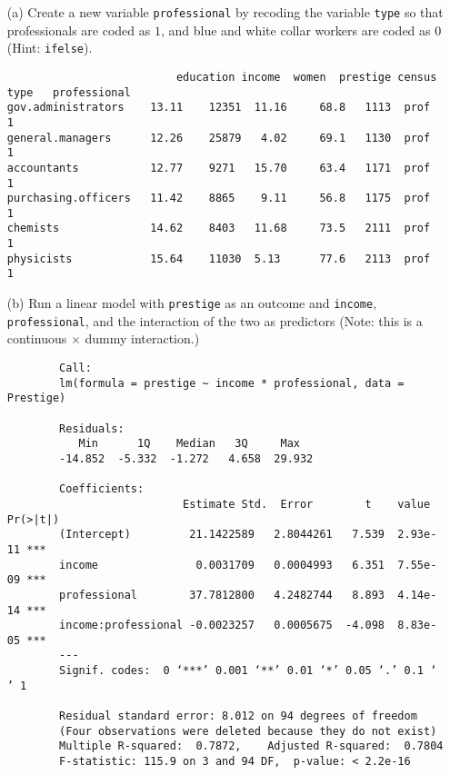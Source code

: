 \documentclass[12pt,letterpaper]{article}
\begin{document}
\newpage
\begin{enumerate}
	
	\item [(a)]
	Create a new variable \texttt{professional} by recoding the variable \texttt{type} so that professionals are coded as $1$, and blue and white collar workers are coded as $0$ (Hint: \texttt{ifelse}).
	
	\begin{verbatim}
		                  education income  women  prestige census type   professional
gov.administrators    13.11    12351  11.16     68.8   1113  prof        1
general.managers      12.26    25879   4.02     69.1   1130  prof        1
accountants           12.77    9271   15.70     63.4   1171  prof        1
purchasing.officers   11.42    8865    9.11     56.8   1175  prof        1
chemists              14.62    8403   11.68     73.5   2111  prof        1
physicists            15.64    11030  5.13      77.6   2113  prof        1
	\end{verbatim}
	\vspace{0cm}
	
	\item [(b)]
	Run a linear model with \texttt{prestige} as an outcome and \texttt{income}, \texttt{professional}, and the interaction of the two as predictors (Note: this is a continuous $\times$ dummy interaction.)
	
	\begin{verbatim}
		Call:
		lm(formula = prestige ~ income * professional, data = Prestige)
		
		Residuals:
		   Min      1Q    Median   3Q     Max 
		-14.852  -5.332  -1.272   4.658  29.932 
		
		Coefficients:
		                   Estimate Std.  Error        t    value Pr(>|t|)    
		(Intercept)         21.1422589   2.8044261   7.539  2.93e-11 ***
		income               0.0031709   0.0004993   6.351  7.55e-09 ***
		professional        37.7812800   4.2482744   8.893  4.14e-14 ***
		income:professional -0.0023257   0.0005675  -4.098  8.83e-05 ***
		---
		Signif. codes:  0 ‘***’ 0.001 ‘**’ 0.01 ‘*’ 0.05 ‘.’ 0.1 ‘ ’ 1
		
		Residual standard error: 8.012 on 94 degrees of freedom
		(Four observations were deleted because they do not exist)
		Multiple R-squared:  0.7872,	Adjusted R-squared:  0.7804 
		F-statistic: 115.9 on 3 and 94 DF,  p-value: < 2.2e-16
	\end{verbatim}
	

\end{enumerate}
\end{document}
